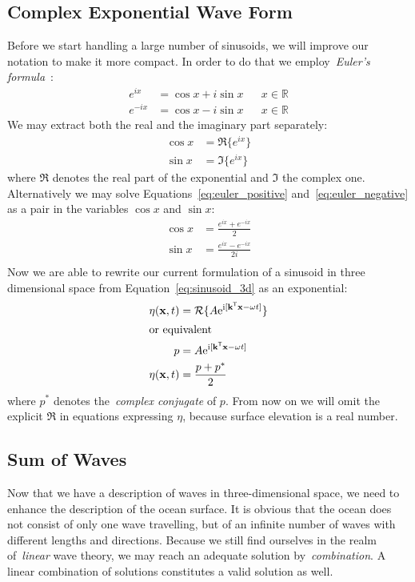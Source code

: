 \subsection{Complex Exponential Wave Form}
%
Before we start handling a large number of sinusoids, we will improve our
notation to make it more compact. In order to do that we employ~\emph{Euler's
formula}~\citep{Euler:1748}:
\begin{align}
\label{eq:euler_positive} e^{ix} &= \cos{x} + i\sin{x} && x \in \mathbb{R} \\
\label{eq:euler_negative} e^{-ix} &= \cos{x} - i\sin{x} && x \in \mathbb{R}
\end{align}
%
We may extract both the real and the imaginary part separately:
\begin{align*}
 \cos{x} &= \Re\{e^{ix}\} \\
 \sin{x} &= \Im\{e^{ix}\}
\end{align*}
where $\Re$ denotes the real part of the exponential and $\Im$ the
complex one. Alternatively we may solve Equations~\ref{eq:euler_positive}
and~\ref{eq:euler_negative} as a pair in the variables $\cos{x}$ and $\sin{x}$:
\begin{align*}
 \cos{x} &= \frac{e^{ix}+e^{-ix}}{2}\\
 \sin{x} &= \frac{e^{ix}-e^{-ix}}{2i}\\
\end{align*}
Now we are able to rewrite our current formulation of a sinusoid in three
dimensional space from Equation~\ref{eq:sinusoid_3d} as an exponential:
%
\begin{align}
\label{eq:sinusoid_exponential_sa} \eta(\mathbf{x}, t) &=
\mathcal{R}\{A\mathrm{e}^{\mathrm{i}[\mathbf{k}^{\mathsf{T}}\mathbf{x} -{\omega}t]}\} \\
\intertext{or equivalent}
 p &= A\mathrm{e}^{\mathrm{i}[\mathbf{k}^{\mathsf{T}}\mathbf{x} -
{\omega}t]} \nonumber \\
 \eta(\mathbf{x}, t) &= \frac{p+p^*}{2} \nonumber
\end{align}
%
where $p^*$ denotes the~\emph{complex conjugate} of $p$. From now on we will
omit the explicit $\Re$ in equations expressing $\eta$, because surface
elevation is a real number.
%
\subsection{Sum of Waves}
Now that we have a description of waves in three-dimensional space, we need to
enhance the description of the ocean surface. It is obvious that the ocean does
not consist of only one wave travelling, but of an infinite number of waves with
different lengths and directions. Because we still find ourselves in the realm
of~\emph{linear} wave theory, we may reach an adequate solution
by~\emph{combination}. A linear combination of solutions constitutes a valid
solution as well.

